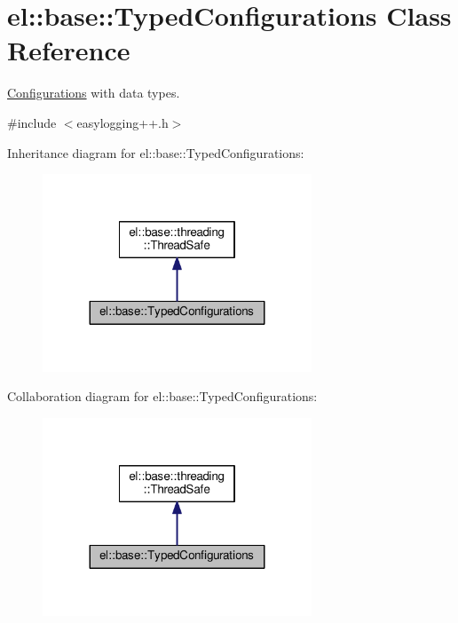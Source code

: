 \hypertarget{classel_1_1base_1_1_typed_configurations}{}\section{el\+:\+:base\+:\+:Typed\+Configurations Class Reference}
\label{classel_1_1base_1_1_typed_configurations}


\hyperlink{classel_1_1_configurations}{Configurations} with data types.  




{\ttfamily \#include $<$easylogging++.\+h$>$}



Inheritance diagram for el\+:\+:base\+:\+:Typed\+Configurations\+:
\nopagebreak
\begin{figure}[H]
\begin{center}
\leavevmode
\includegraphics[width=227pt]{classel_1_1base_1_1_typed_configurations__inherit__graph}
\end{center}
\end{figure}


Collaboration diagram for el\+:\+:base\+:\+:Typed\+Configurations\+:
\nopagebreak
\begin{figure}[H]
\begin{center}
\leavevmode
\includegraphics[width=227pt]{classel_1_1base_1_1_typed_configurations__coll__graph}
\end{center}
\end{figure}
